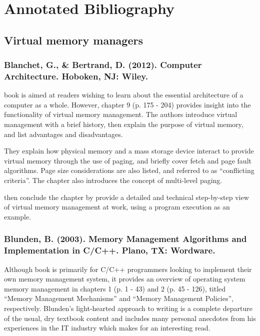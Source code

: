 \section{Annotated Bibliography}

\subsection{Virtual memory managers}

\subsubsection*{Blanchet, G., \& Bertrand, D. (2012). Computer Architecture. Hoboken, NJ: Wiley.}

 book is aimed at readers wishing to learn about the essential architecture of a computer as a whole. However, chapter 9 (p. 175 - 204) provides insight into the functionality of virtual memory management. The authors introduce virtual management with a brief history, then explain the purpose of virtual memory, and list advantages and disadvantages. %

They explain how physical memory and a mass storage device interact to provide virtual memory through the use of paging, and briefly cover fetch and page fault algorithms. Page size considerations are also listed, and referred to as ``conflicting criteria''. The chapter also introduces the concept of multi-level paging.

\citet{Blanchet2012} then conclude the chapter by provide a detailed and technical step-by-step view of virtual memory management at work, using a program execution as an example.

\subsubsection*{Blunden, B. (2003). Memory Management Algorithms and Implementation in C/C++. Plano, TX: Wordware.}

Although  book is primarily for C/C++ programmers looking to implement their own memory management system, it provides an overview of operating system memory management in chapters 1 (p. 1 - 43) and 2 (p. 45 - 126), titled ``Memory Management Mechanisms'' and ``Memory Management Policies'', respectively. Blunden's light-hearted approach to writing is a complete departure of the usual, dry textbook content and includes many personal anecdotes from his experiences in the IT industry which makes for an interesting read.

